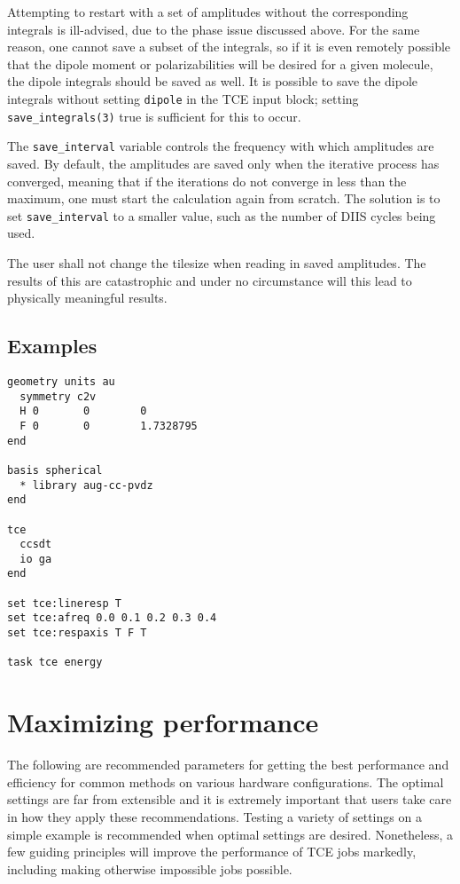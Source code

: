 Attempting to restart with a set of amplitudes without the corresponding integrals is ill-advised, due to the phase issue discussed above.  For the same reason, one cannot save a subset of the integrals, so if it is even remotely possible that the dipole moment or polarizabilities will be desired for a given molecule, the dipole integrals should be saved as well.  It is possible to save the dipole integrals without setting \verb+dipole+ in the TCE input block; setting \verb+save_integrals(3)+ true is sufficient for this to occur.

The \verb+save_interval+ variable controls the frequency with which amplitudes are saved.  By default, the amplitudes are saved only when the iterative process has converged, meaning that if the iterations do not converge in less than the maximum, one must start the calculation again from scratch.  The solution is to set \verb+save_interval+ to a smaller value, such as the number of DIIS cycles being used.

The user shall not change the tilesize when reading in saved amplitudes.  The results of this are catastrophic and under no circumstance will this lead to physically meaningful results.

\subsection{Examples}

\begin{verbatim}
geometry units au
  symmetry c2v
  H 0       0        0
  F 0       0        1.7328795
end

basis spherical
  * library aug-cc-pvdz
end

tce
  ccsdt
  io ga
end

set tce:lineresp T
set tce:afreq 0.0 0.1 0.2 0.3 0.4
set tce:respaxis T F T

task tce energy
\end{verbatim}

\section{Maximizing performance}

The following are recommended parameters for getting the best performance and efficiency for common methods on various hardware configurations.  The optimal settings are far from extensible and it is extremely important that users take care in how they apply these recommendations.  Testing a variety of settings on a simple example is recommended when optimal settings are desired.  Nonetheless, a few guiding principles will improve the performance of TCE jobs markedly, including making otherwise impossible jobs possible.


